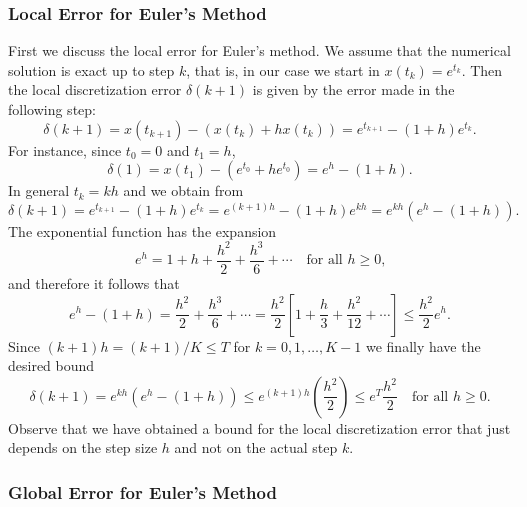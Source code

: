 \documentclass{ximera}
\begin{document}
\subsubsection*{Local Error for Euler's Method}

First we discuss the local error for Euler's method.  
We assume that the
numerical solution is exact up to step $k$, that is, in our case
we start in $x(t_k)=e^{t_k}$.  Then the local discretization error 
$\delta(k+1)$ is given by the error made in the following step:
\begin{equation}
\label{eq:locerrdef}
\delta(k+1) = x(t_{k+1}) - (x(t_k) + h x(t_k))=
e^{t_{k+1}} - (1+h)e^{t_k}.
\end{equation}
For instance, since $t_0=0$ and $t_1=h$,
\[
\delta(1) = x(t_1) - (e^{t_0} + h e^{t_0}) = e^h-(1+h).
\]
In general $t_k = kh$ and we obtain from 
\[
\delta(k+1) = e^{t_{k+1}} - (1+h)e^{t_k} = 
e^{(k+1)h} - (1+h)e^{kh} = e^{kh}(e^h-(1+h)).
\]
The exponential function has the expansion
\begin{equation}
\label{eq:ehgeh}
e^h=1+h+\frac{h^2}{2}+\frac{h^3}{6}+\cdots
\quad \mbox{for all $h\ge 0$,}
\end{equation}
and therefore it follows that
\[
e^h-(1+h) = \frac{h^2}{2}+\frac{h^3}{6}+\cdots =
\frac{h^2}{2}\left[ 1+\frac{h}{3}+\frac{h^2}{12}+\cdots\right]
\le \frac{h^2}{2}e^h.
\]
Since $(k+1)h=(k+1)/K\le T$ for $k=0,1,\ldots,K-1$ we finally have the 
desired bound
\begin{equation}
\label{eq:locerr}
\delta(k+1) = e^{kh}(e^h-(1+h)) \le e^{(k+1)h}\left(\frac{h^2}{2}\right)\le
e^T\frac{h^2}{2} \quad \mbox{for all $h\ge 0$.}
\end{equation}
Observe that we have obtained a bound for the local discretization
error that just 
depends on the step size $h$ and not on the actual 
step $k$.

\subsubsection*{Global Error for Euler's Method}
\end{document}
